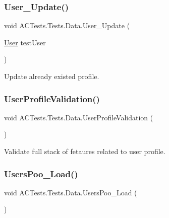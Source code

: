 \subsubsection{\texorpdfstring{User\+\_\+\+Update()}{User\_Update()}}
{\footnotesize\ttfamily void A\+C\+Tests.\+Tests.\+Data.\+User\+\_\+\+Update (\begin{DoxyParamCaption}\item[{\mbox{\hyperlink{class_authority_controller_1_1_data_1_1_personal_1_1_user}{User}}}]{test\+User }\end{DoxyParamCaption})}



Update already existed profile. 

\mbox{\label{class_a_c_tests_1_1_tests_1_1_data_ab71c64448d6988fb560e3186f112f25e}} 
\subsubsection{\texorpdfstring{User\+Profile\+Validation()}{UserProfileValidation()}}
{\footnotesize\ttfamily void A\+C\+Tests.\+Tests.\+Data.\+User\+Profile\+Validation (\begin{DoxyParamCaption}{ }\end{DoxyParamCaption})}



Validate full stack of fetaures related to user profile. 

\mbox{\label{class_a_c_tests_1_1_tests_1_1_data_af64fbea59748f51cde98b4880717ae98}} 
\subsubsection{\texorpdfstring{Users\+Poo\+\_\+\+Load()}{UsersPoo\_Load()}}
{\footnotesize\ttfamily void A\+C\+Tests.\+Tests.\+Data.\+Users\+Poo\+\_\+\+Load (\begin{DoxyParamCaption}{ }\end{DoxyParamCaption})}



